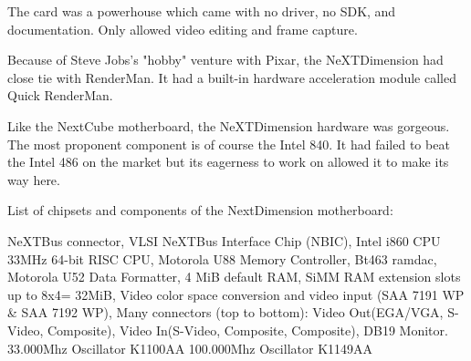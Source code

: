 \par
\par
The card was a powerhouse which came with no driver, no SDK, and documentation. Only  allowed video editing and frame capture.\\
\par
{}
\par
Because of Steve Jobs's "hobby" venture with Pixar, the NeXTDimension had close tie with RenderMan. It had a built-in hardware acceleration module called Quick RenderMan.\\
\par
\par

\par
Like the NextCube motherboard, the NeXTDimension hardware was gorgeous. The most proponent component is of course the Intel 840. It had failed to beat the Intel 486 on the market but its eagerness to work on \doom allowed it to make its way here.\\
\par
{}
\par
List of chipsets and components of the NextDimension motherboard:\\
\par 
{} NeXTBus connector,
 VLSI NeXTBus Interface Chip (NBIC),
 Intel i860 CPU 33MHz 64-bit RISC CPU,
 Motorola U88 Memory Controller,
 Bt463 ramdac,
 Motorola U52 Data Formatter,
 4 MiB default RAM,
 SiMM RAM extension slots up to 8x4= 32MiB,
 Video color space conversion and video input (SAA 7191 WP \& SAA 7192 WP), 
 Many connectors (top to bottom): Video Out(EGA/VGA, S-Video, Composite), Video In(S-Video, Composite, Composite), DB19 Monitor.
 33.000Mhz Oscillator K1100AA
 100.000Mhz Oscillator K1149AA
\par

